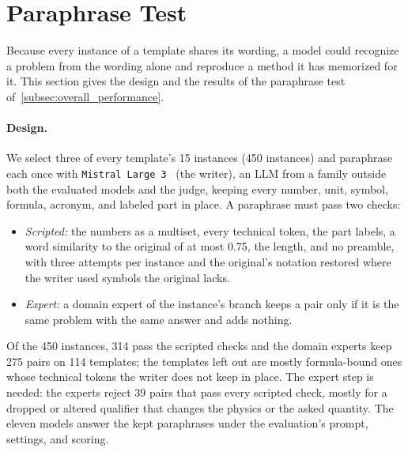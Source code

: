 \section{Paraphrase Test}
\label{appendix:paraphrase}

Because every instance of a template shares its wording, a model could recognize a problem from the
wording alone and reproduce a method it has memorized for it.
This section gives the design and the results of the paraphrase test
of~\autoref{subsec:overall_performance}.

\paragraph{Design.} We select three of every template's 15 instances (450 instances) and paraphrase
each once with \texttt{Mistral Large 3}~\citep{mistral2025mistral3} (the writer), an LLM from a
family outside both the evaluated models and the judge, keeping every number, unit, symbol,
formula, acronym, and labeled part in place.
A paraphrase must pass two checks:
\begin{itemize}[nosep, leftmargin=*]
\item \emph{Scripted:} the numbers as a multiset, every technical token, the part labels, a word
similarity to the original of at most 0.75, the length, and no preamble, with three attempts per
instance and the original's notation restored where the writer used symbols the original lacks.
\item \emph{Expert:} a domain expert of the instance's branch keeps a pair only if it is the same
problem with the same answer and adds nothing.
\end{itemize}
Of the 450 instances, 314 pass the scripted checks and the domain experts keep 275 pairs on 114
templates; the templates left out are mostly formula-bound ones whose technical tokens the writer
does not keep in place.
The expert step is needed: the experts reject 39 pairs that pass every scripted check, mostly for
a dropped or altered qualifier that changes the physics or the asked quantity.
The eleven models answer the kept paraphrases under the evaluation's prompt, settings, and scoring.

